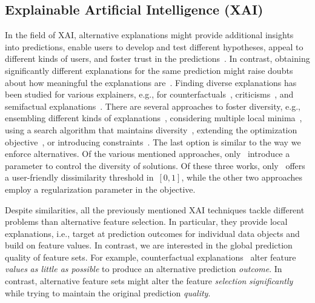 \documentclass{article}
\theoremstyle{definition}
\begin{document}
\subsection{Explainable Artificial Intelligence (XAI)}
\label{sec:afs:related-work:xai}

In the field of XAI, alternative explanations might provide additional insights into predictions, enable users to develop and test different hypotheses, appeal to different kinds of users, and foster trust in the predictions~\cite{kim2021multi, wang2019designing}.
In contrast, obtaining significantly different explanations for the same prediction might raise doubts about how meaningful the explanations are~\cite{jain2019attention}.
Finding diverse explanations has been studied for various explainers, e.g., for counterfactuals~\cite{dandl2020multi, karimi2020model, mohammadi2021scaling, mothilal2020explaining, russell2019efficient, wachter2017counterfactual}, criticisms~\cite{kim2016examples}, and semifactual explanations~\cite{artelt2022even}.
There are several approaches to foster diversity, e.g., ensembling different kinds of explanations~\cite{silva2019produce}, considering multiple local minima~\cite{wachter2017counterfactual}, using a search algorithm that maintains diversity~\cite{dandl2020multi}, extending the optimization objective~\cite{artelt2022even, kim2016examples, mothilal2020explaining}, or introducing constraints~\cite{karimi2020model, mohammadi2021scaling, russell2019efficient}.
The last option is similar to the way we enforce alternatives.
Of the various mentioned approaches, only~\cite{artelt2022even, mohammadi2021scaling, mothilal2020explaining} introduce a parameter to control the diversity of solutions.
Of these three works, only~\cite{mohammadi2021scaling} offers a user-friendly dissimilarity threshold in~$[0,1]$, while the other two approaches employ a regularization parameter in the objective.

Despite similarities, all the previously mentioned XAI techniques tackle different problems than alternative feature selection.
In particular, they provide local explanations, i.e., target at prediction outcomes for individual data objects and build on feature values.
In contrast, we are interested in the global prediction quality of feature sets.
For example, counterfactual explanations~\cite{guidotti2022counterfactual, stepin2021survey, verma2020counterfactual} alter feature \emph{values} \emph{as little as possible} to produce an alternative prediction \emph{outcome}.
In contrast, alternative feature sets might alter the feature \emph{selection} \emph{significantly} while trying to maintain the original prediction \emph{quality}.
\end{document}
